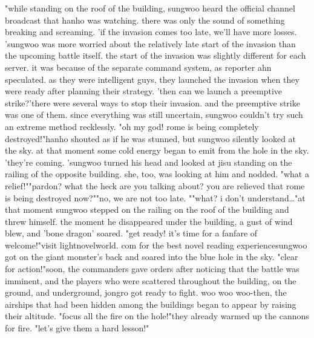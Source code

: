 "while standing on the roof of the building, sungwoo heard the official channel broadcast that hanho was watching.
 there was only the sound of something breaking and screaming.
'if the invasion comes too late, we'll have more losses.
'sungwoo was more worried about the relatively late start of the invasion than the upcoming battle itself.
 the start of the invasion was slightly different for each server.
 it was because of the separate command system, as reporter ahn speculated.
as they were intelligent guys, they launched the invasion when they were ready after planning their strategy.
'then can we launch a preemptive strike?'there were several ways to stop their invasion.
 and the preemptive strike was one of them.
since everything was still uncertain, sungwoo couldn't try such an extreme method recklessly.
"oh my god! rome is being completely destroyed!"hanho shouted as if he was stunned, but sungwoo silently looked at the sky.
at that moment some cold energy began to emit from the hole in the sky.
'they're coming.
'sungwoo turned his head and looked at jisu standing on the railing of the opposite building.
 she, too, was looking at him and nodded.
"what a relief!""pardon? what the heck are you talking about? you are relieved that rome is being destroyed now?""no, we are not too late.
""what? i don't understand…"at that moment sungwoo stepped on the railing on the roof of the building and threw himself.
 the moment he disappeared under the building, a gust of wind blew, and 'bone dragon' soared.
"get ready! it's time for a fanfare of welcome!"visit lightnovelworld.
c‌om for the best novel reading experiencesungwoo got on the giant monster's back and soared into the blue hole in the sky.
"clear for action!"soon, the commanders gave orders after noticing that the battle was imminent, and the players who were scattered throughout the building, on the ground, and underground, jongro got ready to fight.
woo woo woo-then, the airships that had been hidden among the buildings began to appear by raising their altitude.
"focus all the fire on the hole!"they already warmed up the cannons for fire.
"let's give them a hard lesson!"

